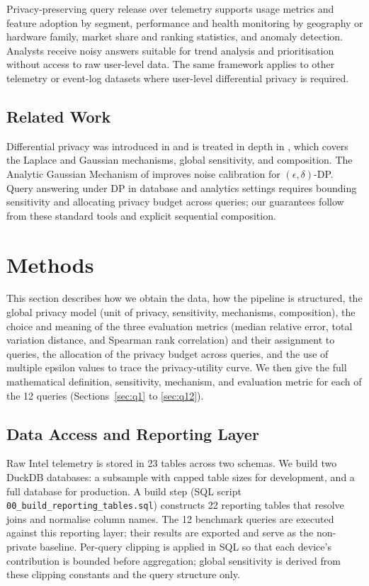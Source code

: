 \documentclass[12pt,letterpaper]{article}
\begin{document}
Privacy-preserving query release over telemetry supports usage metrics and feature adoption by segment, performance and health monitoring by geography or hardware family, market share and ranking statistics, and anomaly detection. Analysts receive noisy answers suitable for trend analysis and prioritisation without access to raw user-level data. The same framework applies to other telemetry or event-log datasets where user-level differential privacy is required.

\subsection{Related Work}
\label{sec:related}

Differential privacy was introduced in \cite{dwork2006calibrating} and is treated in depth in \cite{dwork2014promise}, which covers the Laplace and Gaussian mechanisms, global sensitivity, and composition. The Analytic Gaussian Mechanism of \cite{balle2018improving} improves noise calibration for $(\epsilon,\delta)$-DP. Query answering under DP in database and analytics settings requires bounding sensitivity and allocating privacy budget across queries; our guarantees follow from these standard tools and explicit sequential composition.

\section{Methods}
\label{sec:methods}

This section describes how we obtain the data, how the pipeline is structured, the global privacy model (unit of privacy, sensitivity, mechanisms, composition), the choice and meaning of the three evaluation metrics (median relative error, total variation distance, and Spearman rank correlation) and their assignment to queries, the allocation of the privacy budget across queries, and the use of multiple epsilon values to trace the privacy-utility curve. We then give the full mathematical definition, sensitivity, mechanism, and evaluation metric for each of the 12 queries (Sections~\ref{sec:q1} to \ref{sec:q12}).

\subsection{Data Access and Reporting Layer}
\label{sec:data_access}

Raw Intel telemetry is stored in 23 tables across two schemas. We build two DuckDB databases: a subsample with capped table sizes for development, and a full database for production. A build step (SQL script \texttt{00\_build\_reporting\_tables.sql}) constructs 22 reporting tables that resolve joins and normalise column names. The 12 benchmark queries are executed against this reporting layer; their results are exported and serve as the non-private baseline. Per-query clipping is applied in SQL so that each device's contribution is bounded before aggregation; global sensitivity is derived from these clipping constants and the query structure only.
\end{document}
